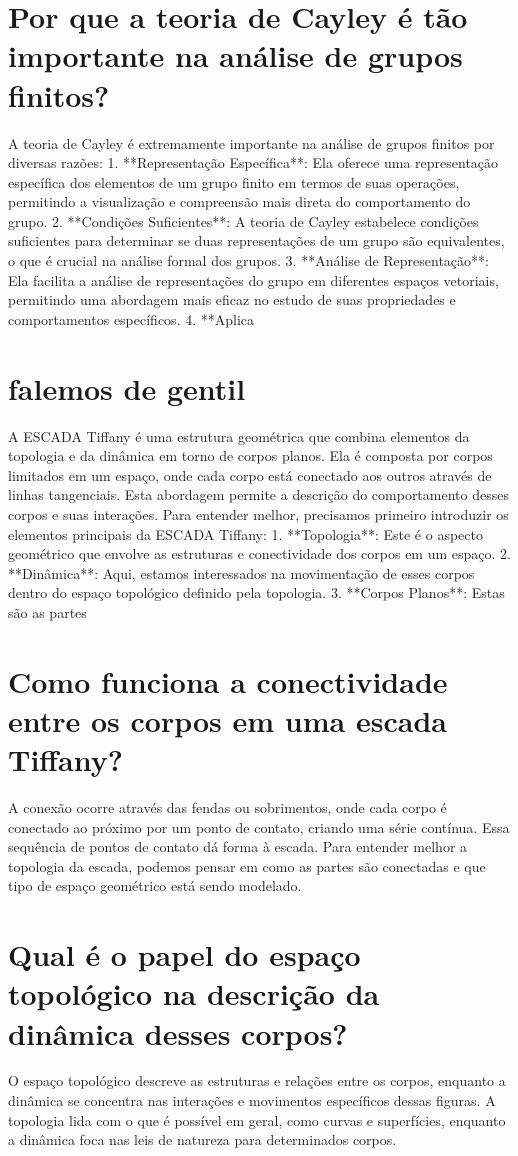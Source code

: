 \documentclass[11pt,a4paper]{article}
\begin{document}
\section{Por que a teoria de Cayley é tão importante na análise de grupos finitos?}
A teoria de Cayley é extremamente importante na análise de grupos finitos por diversas razões: 1. **Representação Específica**: Ela oferece uma representação específica dos elementos de um grupo finito em termos de suas operações, permitindo a visualização e compreensão mais direta do comportamento do grupo. 2. **Condições Suficientes**: A teoria de Cayley estabelece condições suficientes para determinar se duas representações de um grupo são equivalentes, o que é crucial na análise formal dos grupos. 3. **Análise de Representação**: Ela facilita a análise de representações do grupo em diferentes espaços vetoriais, permitindo uma abordagem mais eficaz no estudo de suas propriedades e comportamentos específicos. 4. **Aplica

\section{falemos de gentil}
A ESCADA Tiffany é uma estrutura geométrica que combina elementos da topologia e da dinâmica em torno de corpos planos. Ela é composta por corpos limitados em um espaço, onde cada corpo está conectado aos outros através de linhas tangenciais. Esta abordagem permite a descrição do comportamento desses corpos e suas interações. Para entender melhor, precisamos primeiro introduzir os elementos principais da ESCADA Tiffany: 1. **Topologia**: Este é o aspecto geométrico que envolve as estruturas e conectividade dos corpos em um espaço. 2. **Dinâmica**: Aqui, estamos interessados na movimentação de esses corpos dentro do espaço topológico definido pela topologia. 3. **Corpos Planos**: Estas são as partes

\section{Como funciona a conectividade entre os corpos em uma escada Tiffany?}
A conexão ocorre através das fendas ou sobrimentos, onde cada corpo é conectado ao próximo por um ponto de contato, criando uma série contínua. Essa sequência de pontos de contato dá forma à escada. Para entender melhor a topologia da escada, podemos pensar em como as partes são conectadas e que tipo de espaço geométrico está sendo modelado.

\section{Qual é o papel do espaço topológico na descrição da dinâmica desses corpos?}
O espaço topológico descreve as estruturas e relações entre os corpos, enquanto a dinâmica se concentra nas interações e movimentos específicos dessas figuras. A topologia lida com o que é possível em geral, como curvas e superfícies, enquanto a dinâmica foca nas leis de natureza para determinados corpos.
\end{document}
